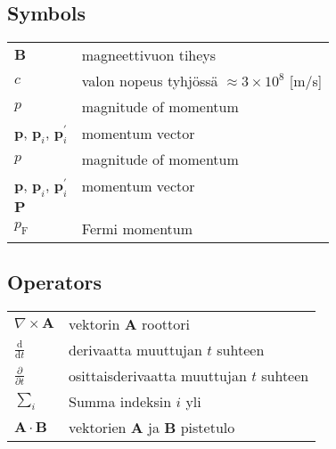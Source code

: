 \subsection*{Symbols}

\begin{tabular}{ll}
$\mathbf{B}$  & magneettivuon tiheys  \\
$c$              & valon nopeus tyhjössä $\approx 3\times10^8$ [m/s]\\
$p$              & magnitude of momentum \\
$\boldsymbol p$, $\boldsymbol p_i$, $\boldsymbol p_i^{'}$  & momentum vector \\
$p$              & magnitude of momentum \\
$\boldsymbol p$, $\boldsymbol p_i$, $\boldsymbol p_i^{'}$  & momentum vector \\
$\boldsymbol P$  &  \\
$p_{\mathrm{F}}$ & Fermi momentum 

\end{tabular}

\subsection*{Operators}

\begin{tabular}{ll}
$\nabla \times \mathbf{A}$              & vektorin $\mathbf{A}$ roottori\\
$\displaystyle\frac{\mbox{d}}{\mbox{d} t}$ & derivaatta muuttujan $t$ suhteen\\
[3mm]
$\displaystyle\frac{\partial}{\partial t}$  & osittaisderivaatta muuttujan $t$ suhteen \\[3mm]
$\sum_i $                       & Summa indeksin $i$ yli\\
$\mathbf{A} \cdot \mathbf{B}$    & vektorien $\mathbf{A}$ ja $\mathbf{B}$ pistetulo
\end{tabular}


